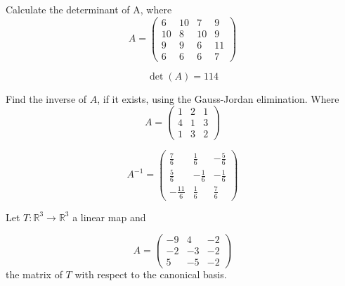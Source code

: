 \begin{questions}

\question Calculate the determinant of A, where
$$
A=\left(\begin{array}{rrrr}
6 & 10 & 7 & 9 \\
10 & 8 & 10 & 9 \\
9 & 9 & 6 & 11 \\
6 & 6 & 6 & 7
\end{array}\right)
$$

\begin{solution}
$$\det(A)=114$$
\end{solution}

\question Find the inverse of $A$, if it exists, using the Gauss-Jordan elimination. Where
$$
A=\left(\begin{array}{rrr}
1 & 2 & 1 \\
4 & 1 & 3 \\
1 & 3 & 2
\end{array}\right)
$$

\begin{solution}
$$A^{-1}=\left(\begin{array}{rrr}
\frac{7}{6} & \frac{1}{6} & -\frac{5}{6} \\
\frac{5}{6} & -\frac{1}{6} & -\frac{1}{6} \\
-\frac{11}{6} & \frac{1}{6} & \frac{7}{6}
\end{array}\right)$$
\end{solution}

\question Let $T:\mathbb{R}^3\rightarrow\mathbb{R}^3$  a linear map and
 
$$
A=\left(\begin{array}{rrr}
-9 & 4 & -2 \\
-2 & -3 & -2 \\
5 & -5 & -2
\end{array}\right)
$$
the matrix of $T$ with respect to the canonical basis.
\end{questions}
